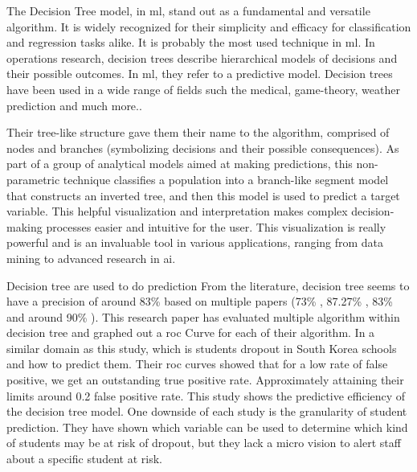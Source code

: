 \documentclass[../../../main.tex]{subfiles}
\begin{document}
The Decision Tree model, in \acrshort{ml}, stand out as a fundamental and versatile algorithm. It is widely recognized for their simplicity and efficacy for classification and regression tasks alike. It is probably the most used technique in \acrshort{ml}. \cite{hofmann_rapidminer_2016}
In operations research, decision trees describe hierarchical models of decisions and their possible outcomes. In \acrshort{ml}, they refer to a predictive model.\cite{rokach_data_2015}
Decision trees have been used in a wide range of fields such the medical, game-theory, weather prediction and much more.\cite{quinlan_induction_1986}.

Their tree-like structure gave them their name to the algorithm, comprised of nodes and branches (symbolizing decisions and their possible consequences). As part of a group of analytical models aimed at making predictions, this non-parametric technique classifies a population into a branch-like segment model that constructs an inverted tree, and then this model is used to predict a target variable.\cite{song_decision_2015} This helpful visualization and interpretation makes complex decision-making processes easier and intuitive for the user. This visualization is really powerful and is an invaluable tool in various applications, ranging from data mining to advanced research in \acrfull{}{ai}.

Decision tree are used to do prediction
From the literature, decision tree seems to have a precision of around 83\% based on multiple papers (73\% \cite{viloria_integration_2019}, 87.27\% \cite{ramirez_prediction_2018}, 83\%\cite{kemper_predicting_2020} and around 90\% \cite{tenpipat_student_2020}). 
This research paper has evaluated multiple algorithm within decision tree and graphed out a \acrshort{roc} Curve for each of their algorithm. In a similar domain as this study, which is students dropout in South Korea schools and how to predict them. Their \acrshort{roc} curves showed that for a low rate of false positive, we get an outstanding true positive rate. Approximately attaining their limits around 0.2 false positive rate\cite{lee_machine_2019}. This study shows the predictive efficiency of the decision tree model. 
One downside of each study is the granularity of student prediction. They have shown which variable can be used to determine which kind of students may be at risk of dropout, but they lack a micro vision to alert staff about a specific student at risk.
\end{document}
